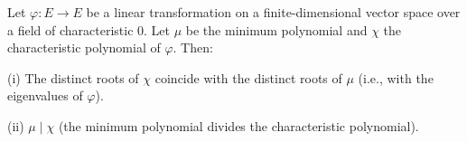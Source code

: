 Let $\varphi: E \to E$ be a linear transformation on a finite-dimensional vector space over a field of characteristic $0$. Let $\mu$ be the minimum polynomial and $\chi$ the characteristic polynomial of $\varphi$. Then:

(i) The distinct roots of $\chi$ coincide with the distinct roots of $\mu$ (i.e., with the eigenvalues of $\varphi$).

(ii) $\mu \mid \chi$ (the minimum polynomial divides the characteristic polynomial).
